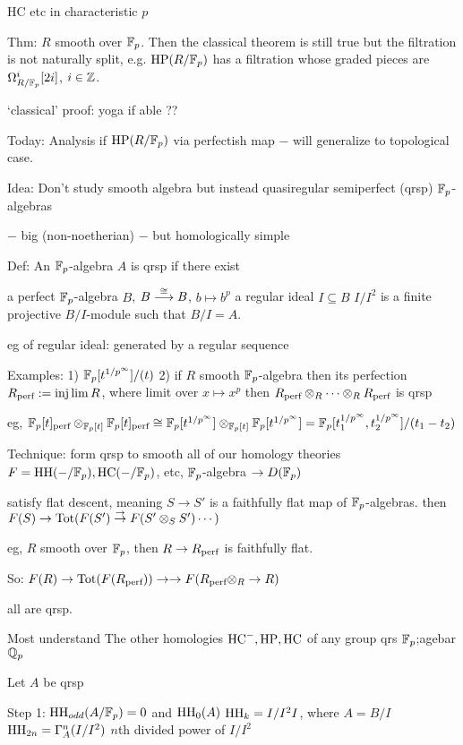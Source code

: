 HC etc in characteristic $p$

Thm: $R$ smooth over $\mathbb{F}_p$. Then the classical theorem is still true but the filtration is not naturally split, e.g. $\operatorname{HP}(R/\mathbb{F}_p)$ has a filtration whose graded pieces are $\Omega_{R/\mathbb{F}_p}^i[2i]$, $i \in \mathbb{Z}$.

`classical' proof: yoga if able ??

Today: Analysis if $\operatorname{HP}(R/\mathbb{F}_p)$ via perfectish map $-$ will generalize to topological case. 

Idea: Don't study smooth algebra but instead quasiregular semiperfect (qrsp) $\mathbb{F}_p$-algebras

$-$ big (non-noetherian)
$-$ but homologically simple

Def: An $\mathbb{F}_p$-algebra $A$ is qrsp if there exist

a perfect $\mathbb{F}_p$-algebra $B$, $B \stackrel{\cong}{\longrightarrow} B$, $b \mapsto b^p$
a regular ideal $I \subseteq B$
$I/I^2$ is a finite projective $B/I$-module such that $B/I= A$. 


eg of regular ideal: generated by a regular sequence

Examples:
1) $\mathbb{F}_p[t^{1/p^\infty}]/(t)$
2) if $R$ smooth $\mathbb{F}_p$-algebra then its perfection $R_{\text{perf}}:= \injlim R$, where limit over $x \mapsto x^p$ then $R_{\text{perf}} \otimes_R \cdots \otimes_R R_{\text{perf}}$ is qrsp

eg, $\mathbb{F}_p[t]_{\text{perf}} \otimes_{\mathbb{F}_p[t]} \mathbb{F}_p[t]_{\text{perf}} \cong \mathbb{F}_p[t^{1/p^\infty}] \otimes_{\mathbb{F}_p[t]} \mathbb{F}_p[t^{1/p^\infty}]= \mathbb{F}_p[t_1^{1/p^\infty}, t_2^{1/p^\infty}]/(t_1-t_2)$


Technique: form qrsp to smooth all of our homology theories $F= \operatorname{HH}(-/\mathbb{F}_p), \operatorname{HC}(-/\mathbb{F}_p)$, etc, 
$\mathbb{F}_p$-algebra $\to D(\mathbb{F}_p)$

satisfy flat descent, meaning $S \to S'$ is a faithfully flat map of $\mathbb{F}_p$-algebras. then $F(S) \to \operatorname{Tot}( F(S') \stackrel{\to}{\to} F(S' \otimes_S S') \cdots)$

eg, $R$ smooth over $\mathbb{F}_p$, then $R \to R_{\text{perf}}$ is faithfully flat. 

So: $F(R) \to \operatorname{Tot}(F(R_{\text{perf}})) \to\to F(R_{\text{perf}} \otimes_R \to R)$

all are qrsp.


Most understand The other homologies $\operatorname{HC}^-,\operatorname{HP},\operatorname{HC}$ of any group qrs $\mathbb{F}_p$;agebar$\mathbb{Q}_p$


Let $A$ be qrsp

Step 1: $\operatorname{HH}_{odd}(A/\mathbb{F}_p)=0$ and $\operatorname{HH}_0(A)$
$\operatorname{HH}_k = I/I^2 I$, where $A= B/I$
$\operatorname{HH}_{2n}= \Gamma_A^n(I/I^2)$
$n$th divided power of $I/I^2$

